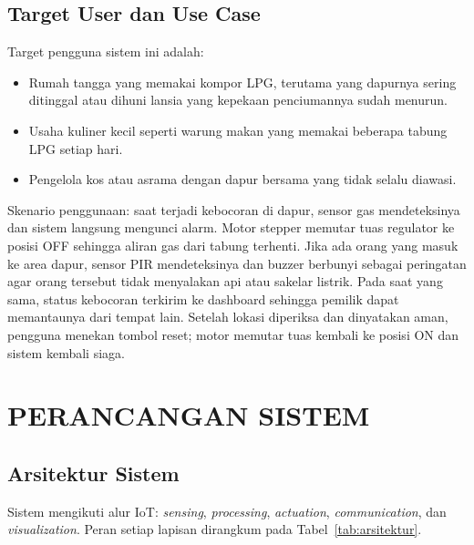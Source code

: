 \documentclass[12pt,a4paper,oneside]{report}
\begin{document}
\section{Target User dan Use Case}
Target pengguna sistem ini adalah:
\begin{itemize}
  \item Rumah tangga yang memakai kompor LPG, terutama yang dapurnya sering ditinggal atau dihuni lansia yang kepekaan penciumannya sudah menurun.
  \item Usaha kuliner kecil seperti warung makan yang memakai beberapa tabung LPG setiap hari.
  \item Pengelola kos atau asrama dengan dapur bersama yang tidak selalu diawasi.
\end{itemize}

Skenario penggunaan: saat terjadi kebocoran di dapur, sensor gas mendeteksinya dan sistem langsung mengunci alarm. Motor stepper memutar tuas regulator ke posisi OFF sehingga aliran gas dari tabung terhenti. Jika ada orang yang masuk ke area dapur, sensor PIR mendeteksinya dan buzzer berbunyi sebagai peringatan agar orang tersebut tidak menyalakan api atau sakelar listrik. Pada saat yang sama, status kebocoran terkirim ke dashboard sehingga pemilik dapat memantaunya dari tempat lain. Setelah lokasi diperiksa dan dinyatakan aman, pengguna menekan tombol reset; motor memutar tuas kembali ke posisi ON dan sistem kembali siaga.

\chapter{PERANCANGAN SISTEM}

\section{Arsitektur Sistem}
Sistem mengikuti alur IoT: \emph{sensing}, \emph{processing}, \emph{actuation}, \emph{communication}, dan \emph{visualization}. Peran setiap lapisan dirangkum pada Tabel~\ref{tab:arsitektur}.
\end{document}
